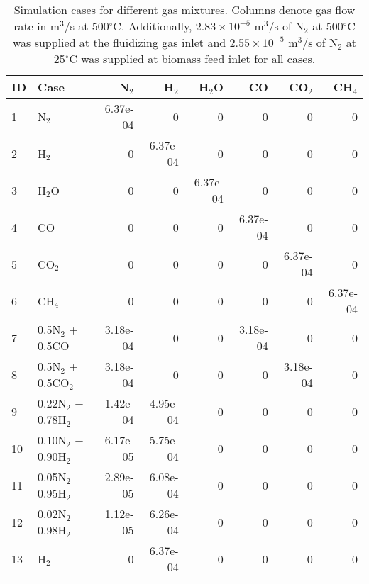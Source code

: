 \begin{table}[H]
    \centering
    \caption{Simulation cases for different gas mixtures. Columns denote gas flow rate in m$^3$/s at 500$^\circ$C. Additionally, $2.83\times10^{-5}$ m$^3$/s of N$_2$ at 500$^\circ$C was supplied at the fluidizing gas inlet and $2.55\times10^{-5}$ m$^3$/s of N$_2$ at 25$^\circ$C was supplied at biomass feed inlet for all cases.}
    \begin{tabular}{llrrrrrr}
        \toprule
        ID  & Case                  & N$_2$     & H$_2$    & H$_2$O   & CO       & CO$_2$    & CH$_4$   \\
        \midrule
        1   & N$_2$                 & 6.37e-04  & 0        & 0        & 0        & 0         & 0        \\
        2   & H$_2$                 & 0         & 6.37e-04 & 0        & 0        & 0         & 0        \\
        3   & H$_2$O                & 0         & 0        & 6.37e-04 & 0        & 0         & 0        \\
        4   & CO                    & 0         & 0        & 0        & 6.37e-04 & 0         & 0        \\
        5   & CO$_2$                & 0         & 0        & 0        & 0        & 6.37e-04  & 0        \\
        6   & CH$_4$                & 0         & 0        & 0        & 0        & 0         & 6.37e-04 \\
        7   & 0.5N$_2$ + 0.5CO      & 3.18e-04  & 0        & 0        & 3.18e-04 & 0         & 0        \\
        8   & 0.5N$_2$ + 0.5CO$_2$  & 3.18e-04  & 0        & 0        & 0        & 3.18e-04  & 0        \\
        9   & 0.22N$_2$ + 0.78H$_2$ & 1.42e-04  & 4.95e-04 & 0        & 0        & 0         & 0        \\
        10  & 0.10N$_2$ + 0.90H$_2$ & 6.17e-05  & 5.75e-04 & 0        & 0        & 0         & 0        \\
        11  & 0.05N$_2$ + 0.95H$_2$ & 2.89e-05  & 6.08e-04 & 0        & 0        & 0         & 0        \\
        12  & 0.02N$_2$ + 0.98H$_2$ & 1.12e-05  & 6.26e-04 & 0        & 0        & 0         & 0        \\
        13  & H$_2$                 & 0         & 6.37e-04 & 0        & 0        & 0         & 0        \\
        \bottomrule
    \end{tabular}
    \label{tab:flowrates}
\end{table}

